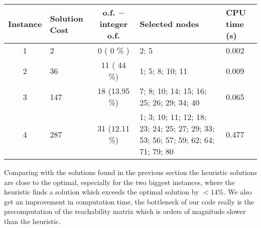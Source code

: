 \begin{table}[h!]
	\centering
	\begin{tabularx}{\textwidth}{|c|X|c|X|X|}
		\hline
		\textbf{Instance} & \textbf{Solution Cost} & \textbf{o.f. $-$ integer o.f.} & \textbf{Selected nodes} & \textbf{CPU time (s)} \\
		\hline
		1 & 2 & 0 ( 0 \% ) & 2; 5 & 0.002 \\
		\hline
		2 & 36 & 11 ( 44 \%) & 1; 5; 8; 10; 11 & 0.009 \\
		\hline
		3 & 147 & 18 (13.95 \%) &7; 8; 10; 14; 15; 16; 25; 26; 29; 34; 40 & 0.065 \\
		\hline
		4 & 287 & 31 (12.11 \%) & 1; 3; 10; 11; 12; 18; 23; 24; 25; 27; 29; 33; 53; 56; 57; 59; 62; 64; 71; 79; 80 & 0.477 \\
		\hline
	\end{tabularx}
\end{table}

Comparing with the solutions found in the previous section the heuristic solutions are close to the optimal,
especially for the two biggest instances, where the heuristic finds a solution which exceeds the optimal solution by $< 14\%$.
We also get an improvement in computation time, the bottleneck of our code really is the precomputation of the reachability matrix which is orders of magnitude slower than the heuristic.
